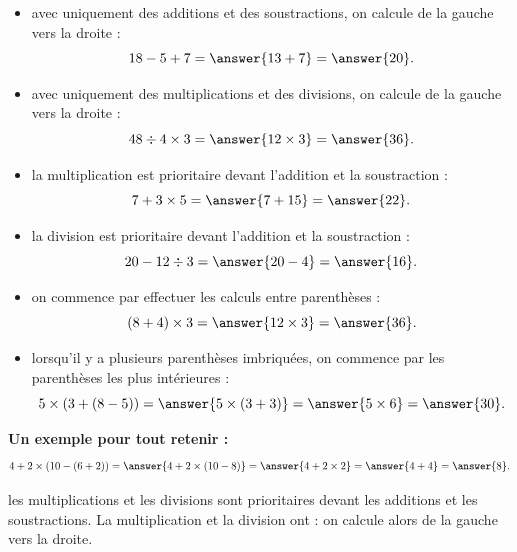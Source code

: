 \begin{exemplebox}
    \begin{itemize}[label=\textbullet]
        \item {} avec uniquement des additions et des soustractions,
        on calcule de la gauche vers la droite :
        \[
            18-5+7
            =\answer{13 +7}
            =\answer{20}.
        \]

        \item {} avec uniquement des multiplications et des divisions,
        on calcule de la gauche vers la droite :
        \[
            48\div4\times3
            =\answer{12\times 3}
            =\answer{36}.
        \]

        \item {} la multiplication est prioritaire devant
        l'addition et la soustraction :
        \[
            7+3\times5
            =\answer{7+15}
            =\answer{22}.
        \]

        \item {} la division est prioritaire devant
        l'addition et la soustraction :
        \[
            20-12\div3
            =\answer{20-4}
            =\answer{16}.
        \]

        \item {} on commence par effectuer les calculs entre
        parenthèses :
        \[
            (8+4)\times3
            =\answer{12\times3}
            =\answer{36}.
        \]

        \item {} lorsqu'il y a plusieurs parenthèses imbriquées,
        on commence par les parenthèses les plus intérieures :
        \[
            5\times(3+(8-5))
            =\answer{5\times(3+3)}
            =\answer{5\times6}
            =\answer{30}.
        \]
    \end{itemize}

    \medskip

    \textbf{Un exemple pour tout retenir :}
    \[
        4+2\times(10-(6+2))
        =\answer{4+2\times(10-8)}
        =\answer{4+2\times2}
        =\answer{4+4}
        =\answer{8}.
    \]

\end{exemplebox}

\begin{attentionbox}
     les multiplications et les divisions sont prioritaires
    devant les additions et les soustractions. La multiplication et la division
    ont  : on calcule alors de la gauche vers la droite.

\end{attentionbox}


